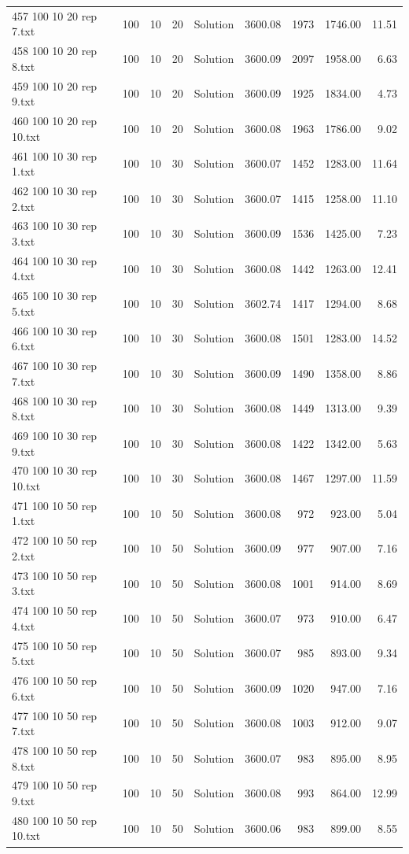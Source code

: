 \begin{longtable}{lrrllrrrr}
457 100 10 20 rep 7.txt & 100 & 10 & 20 & Solution & 3600.08 & 1973 & 1746.00 & 11.51\\
458 100 10 20 rep 8.txt & 100 & 10 & 20 & Solution & 3600.09 & 2097 & 1958.00 &  6.63\\
459 100 10 20 rep 9.txt & 100 & 10 & 20 & Solution & 3600.09 & 1925 & 1834.00 &  4.73\\
460 100 10 20 rep 10.txt & 100 & 10 & 20 & Solution & 3600.08 & 1963 & 1786.00 &  9.02\\
461 100 10 30 rep 1.txt & 100 & 10 & 30 & Solution & 3600.07 & 1452 & 1283.00 & 11.64\\
462 100 10 30 rep 2.txt & 100 & 10 & 30 & Solution & 3600.07 & 1415 & 1258.00 & 11.10\\
463 100 10 30 rep 3.txt & 100 & 10 & 30 & Solution & 3600.09 & 1536 & 1425.00 &  7.23\\
464 100 10 30 rep 4.txt & 100 & 10 & 30 & Solution & 3600.08 & 1442 & 1263.00 & 12.41\\
465 100 10 30 rep 5.txt & 100 & 10 & 30 & Solution & 3602.74 & 1417 & 1294.00 &  8.68\\
466 100 10 30 rep 6.txt & 100 & 10 & 30 & Solution & 3600.08 & 1501 & 1283.00 & 14.52\\
467 100 10 30 rep 7.txt & 100 & 10 & 30 & Solution & 3600.09 & 1490 & 1358.00 &  8.86\\
468 100 10 30 rep 8.txt & 100 & 10 & 30 & Solution & 3600.08 & 1449 & 1313.00 &  9.39\\
469 100 10 30 rep 9.txt & 100 & 10 & 30 & Solution & 3600.08 & 1422 & 1342.00 &  5.63\\
470 100 10 30 rep 10.txt & 100 & 10 & 30 & Solution & 3600.08 & 1467 & 1297.00 & 11.59\\
471 100 10 50 rep 1.txt & 100 & 10 & 50 & Solution & 3600.08 & 972 & 923.00 &  5.04\\
472 100 10 50 rep 2.txt & 100 & 10 & 50 & Solution & 3600.09 & 977 & 907.00 &  7.16\\
473 100 10 50 rep 3.txt & 100 & 10 & 50 & Solution & 3600.08 & 1001 & 914.00 &  8.69\\
474 100 10 50 rep 4.txt & 100 & 10 & 50 & Solution & 3600.07 & 973 & 910.00 &  6.47\\
475 100 10 50 rep 5.txt & 100 & 10 & 50 & Solution & 3600.07 & 985 & 893.00 &  9.34\\
476 100 10 50 rep 6.txt & 100 & 10 & 50 & Solution & 3600.09 & 1020 & 947.00 &  7.16\\
477 100 10 50 rep 7.txt & 100 & 10 & 50 & Solution & 3600.08 & 1003 & 912.00 &  9.07\\
478 100 10 50 rep 8.txt & 100 & 10 & 50 & Solution & 3600.07 & 983 & 895.00 &  8.95\\
479 100 10 50 rep 9.txt & 100 & 10 & 50 & Solution & 3600.08 & 993 & 864.00 & 12.99\\
480 100 10 50 rep 10.txt & 100 & 10 & 50 & Solution & 3600.06 & 983 & 899.00 &  8.55\\
\end{longtable}

